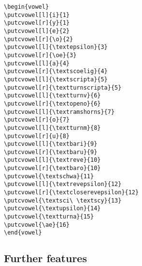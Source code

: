 \begin{frame}[fragile]

\begin{multicols}{2}
	
\begin{lstlisting}
\begin{vowel}
\putcvowel[l]{i}{1}
\putcvowel[r]{y}{1}
\putcvowel[l]{e}{2}
\putcvowel[r]{\o}{2}
\putcvowel[l]{\textepsilon}{3}
\putcvowel[r]{\oe}{3}
\putcvowel[l]{a}{4}
\putcvowel[r]{\textscoelig}{4}
\putcvowel[l]{\textscripta}{5}
\putcvowel[r]{\textturnscripta}{5}
\putcvowel[l]{\textturnv}{6}
\putcvowel[r]{\textopeno}{6}
\putcvowel[l]{\textramshorns}{7}
\putcvowel[r]{o}{7}
\putcvowel[l]{\textturnm}{8}
\putcvowel[r]{u}{8}
\putcvowel[l]{\textbari}{9}
\putcvowel[r]{\textbaru}{9}
\putcvowel[l]{\textreve}{10}
\putcvowel[r]{\textbaro}{10}
\putcvowel{\textschwa}{11}
\putcvowel[l]{\textrevepsilon}{12}
\putcvowel[r]{\textcloserevepsilon}{12}
\putcvowel{\textsci\ \textscy}{13}
\putcvowel{\textupsilon}{14}
\putcvowel{\textturna}{15}
\putcvowel{\ae}{16}
\end{vowel}
\end{lstlisting}

\begin{figure}
\centering
{\Large
\begin{vowel}
\end{vowel}
}
\end{figure}
\end{multicols}


\end{frame}




\subsection{Further features}

